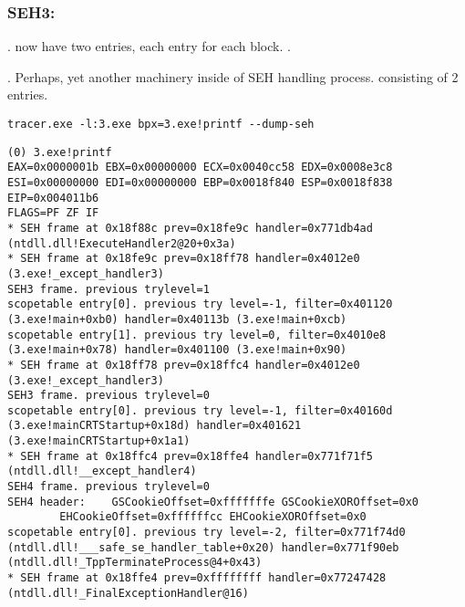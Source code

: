 \subsubsection{SEH3: }



.
  
{now have two entries, each entry for each block}.
 .



 \printf{} .
{Perhaps, yet another machinery inside of SEH handling process}.
  
{consisting of 2 entries}.

\begin{lstlisting}
tracer.exe -l:3.exe bpx=3.exe!printf --dump-seh
\end{lstlisting}

\begin{lstlisting}[caption=tracer.exe output]
(0) 3.exe!printf
EAX=0x0000001b EBX=0x00000000 ECX=0x0040cc58 EDX=0x0008e3c8
ESI=0x00000000 EDI=0x00000000 EBP=0x0018f840 ESP=0x0018f838
EIP=0x004011b6
FLAGS=PF ZF IF
* SEH frame at 0x18f88c prev=0x18fe9c handler=0x771db4ad (ntdll.dll!ExecuteHandler2@20+0x3a)
* SEH frame at 0x18fe9c prev=0x18ff78 handler=0x4012e0 (3.exe!_except_handler3)
SEH3 frame. previous trylevel=1
scopetable entry[0]. previous try level=-1, filter=0x401120 (3.exe!main+0xb0) handler=0x40113b (3.exe!main+0xcb)
scopetable entry[1]. previous try level=0, filter=0x4010e8 (3.exe!main+0x78) handler=0x401100 (3.exe!main+0x90)
* SEH frame at 0x18ff78 prev=0x18ffc4 handler=0x4012e0 (3.exe!_except_handler3)
SEH3 frame. previous trylevel=0
scopetable entry[0]. previous try level=-1, filter=0x40160d (3.exe!mainCRTStartup+0x18d) handler=0x401621 (3.exe!mainCRTStartup+0x1a1)
* SEH frame at 0x18ffc4 prev=0x18ffe4 handler=0x771f71f5 (ntdll.dll!__except_handler4)
SEH4 frame. previous trylevel=0
SEH4 header:	GSCookieOffset=0xfffffffe GSCookieXOROffset=0x0
		EHCookieOffset=0xffffffcc EHCookieXOROffset=0x0
scopetable entry[0]. previous try level=-2, filter=0x771f74d0 (ntdll.dll!___safe_se_handler_table+0x20) handler=0x771f90eb (ntdll.dll!_TppTerminateProcess@4+0x43)
* SEH frame at 0x18ffe4 prev=0xffffffff handler=0x77247428 (ntdll.dll!_FinalExceptionHandler@16)
\end{lstlisting}

